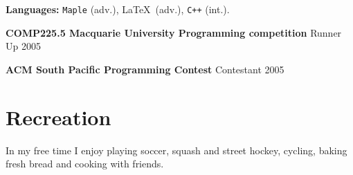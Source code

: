 \documentclass[margin,line]{resume}
\newcommand{\CVsection}[1]{\section{\mysidestyle #1}}
\newcommand{\entry}[3]{\textbf{#1} #2 \hfill {#3}
           
\vspace{-2.7mm}}
\newcommand{\FINALentry}[3]{\textbf{#1} #2 \hfill {#3}}
\begin{document}
\begin{resume}
\entry{Languages:}{\texttt{Maple} (adv.), \LaTeX\ (adv.), \texttt{C++} (int.).}{}
\entry{COMP225.5 Macquarie University Programming competition}{Runner Up}{2005}
\FINALentry{ACM South Pacific Programming Contest}{Contestant}{2005}


\CVsection{Recreation}

In my free time I enjoy playing soccer, squash and street hockey, cycling, baking \\fresh bread and cooking with friends.


%
%



\end{resume}
\end{document}
